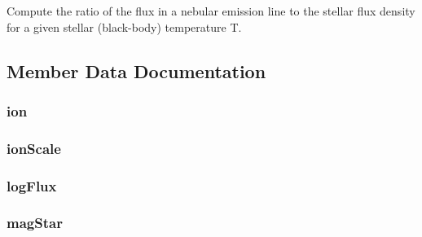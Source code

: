 \begin{DoxyVerb}Compute the ratio of the flux in a nebular emission line to the stellar 
   flux density for a given stellar (black-body) temperature T.
\end{DoxyVerb}
 

\subsection{Member Data Documentation}
\hypertarget{classpyneb_1_1utils_1_1stellar_1_1_zanstra_a1b13bcbedf5b7f9310ec3fba076e96e0}{
\subsubsection[{ion}]{\setlength{\rightskip}{0pt plus 5cm}ion}}\label{classpyneb_1_1utils_1_1stellar_1_1_zanstra_a1b13bcbedf5b7f9310ec3fba076e96e0}
\hypertarget{classpyneb_1_1utils_1_1stellar_1_1_zanstra_a9449c65bcffb0422723533ecc27054ae}{
\subsubsection[{ion\-Scale}]{\setlength{\rightskip}{0pt plus 5cm}ion\-Scale}}\label{classpyneb_1_1utils_1_1stellar_1_1_zanstra_a9449c65bcffb0422723533ecc27054ae}
\hypertarget{classpyneb_1_1utils_1_1stellar_1_1_zanstra_a00ccd651b0e342ae97ae41c8731045c1}{
\subsubsection[{log\-Flux}]{\setlength{\rightskip}{0pt plus 5cm}log\-Flux}}\label{classpyneb_1_1utils_1_1stellar_1_1_zanstra_a00ccd651b0e342ae97ae41c8731045c1}
\hypertarget{classpyneb_1_1utils_1_1stellar_1_1_zanstra_a2517649f439ba0ed4c760c990a24821c}{
\subsubsection[{mag\-Star}]{\setlength{\rightskip}{0pt plus 5cm}mag\-Star}}\label{classpyneb_1_1utils_1_1stellar_1_1_zanstra_a2517649f439ba0ed4c760c990a24821c}
